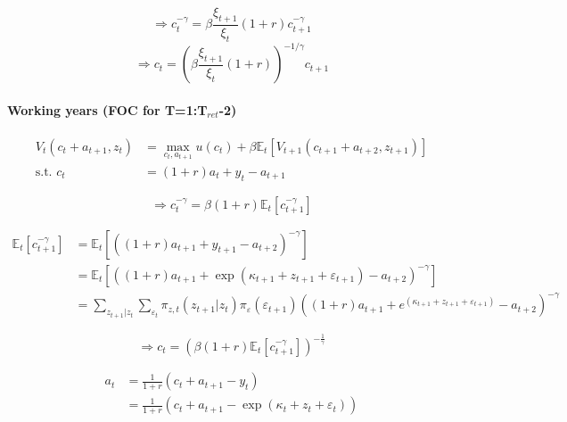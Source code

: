 \documentclass[11pt]{article}
\begin{document}
$$ \Rightarrow c_t^{-\gamma} = \beta \frac{\xi_{t+1}}{\xi_t} (1+r) c_{t+1}^{-\gamma} $$
$$ \Rightarrow c_t = \left(\beta \frac{\xi_{t+1}}{\xi_t} (1+r) \right)^{-1/\gamma} c_{t+1} $$


\paragraph{Working years (FOC for T=1:T$_{ret}$-2)}

\begin{equation*}
\begin{split}
 V_{t}(c_t + a_{t+1}, z_t) &= \max_{c_t,a_{t+1}} u(c_{t}) + \beta \mathbb{E}_t[V_{t+1}(c_{t+1} + a_{t+2}, z_{t+1})] \\
 \text{s.t. } c_t &= (1+r) a_{t}+y_t - a_{t+1}
\end{split}
\end{equation*}

$$ \Rightarrow c_t^{-\gamma} = \beta (1+r) \mathbb{E}_t [c_{t+1}^{-\gamma}] $$

\begin{equation}
\begin{split}
\mathbb{E}_t [c_{t+1}^{-\gamma}] &=
      \mathbb{E}_t [\left( (1+r)a_{t+1} + y_{t+1} - a_{t+2} \right)^{-\gamma}] \\
      &= \mathbb{E}_t [\left((1+r)a_{t+1} + \exp(\kappa_{t+1} + z_{t+1} + \varepsilon_{t+1}) - a_{t+2} \right)^{-\gamma}] \\
      &= \sum_{z_{t+1}|z_t} \sum_{\varepsilon_t} \pi_{z,t}(z_{t+1}|z_t) \pi_\varepsilon(\varepsilon_{t+1}) \left((1+r)a_{t+1} + e^{(\kappa_{t+1} + z_{t+1} + \varepsilon_{t+1})} - a_{t+2} \right)^{-\gamma}
\end{split}
\end{equation}

\begin{equation}
  \Rightarrow c_t = \left( \beta (1+r) \mathbb{E}_t [c_{t+1}^{-\gamma}]  \right) ^{-\frac{1}{\gamma}}
\end{equation}

\begin{equation}
\begin{split}
a_{t} &= \frac{1}{1+r} \left( c_t + a_{t+1} - y_t \right) \\
      &= \frac{1}{1+r} \left( c_t + a_{t+1} - \exp( \kappa_t + z_{t} + \varepsilon_{t}) \right)
\end{split}
\end{equation}
\end{document}
